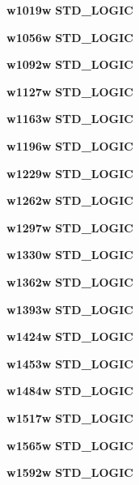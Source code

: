 \begin{DoxyCompactItemize}
\item 
{\bf w1019w} {\bfseries \textcolor{comment}{S\+T\+D\+\_\+\+L\+O\+G\+IC}\textcolor{vhdlchar}{ }} 
\item 
{\bf w1056w} {\bfseries \textcolor{comment}{S\+T\+D\+\_\+\+L\+O\+G\+IC}\textcolor{vhdlchar}{ }} 
\item 
{\bf w1092w} {\bfseries \textcolor{comment}{S\+T\+D\+\_\+\+L\+O\+G\+IC}\textcolor{vhdlchar}{ }} 
\item 
{\bf w1127w} {\bfseries \textcolor{comment}{S\+T\+D\+\_\+\+L\+O\+G\+IC}\textcolor{vhdlchar}{ }} 
\item 
{\bf w1163w} {\bfseries \textcolor{comment}{S\+T\+D\+\_\+\+L\+O\+G\+IC}\textcolor{vhdlchar}{ }} 
\item 
{\bf w1196w} {\bfseries \textcolor{comment}{S\+T\+D\+\_\+\+L\+O\+G\+IC}\textcolor{vhdlchar}{ }} 
\item 
{\bf w1229w} {\bfseries \textcolor{comment}{S\+T\+D\+\_\+\+L\+O\+G\+IC}\textcolor{vhdlchar}{ }} 
\item 
{\bf w1262w} {\bfseries \textcolor{comment}{S\+T\+D\+\_\+\+L\+O\+G\+IC}\textcolor{vhdlchar}{ }} 
\item 
{\bf w1297w} {\bfseries \textcolor{comment}{S\+T\+D\+\_\+\+L\+O\+G\+IC}\textcolor{vhdlchar}{ }} 
\item 
{\bf w1330w} {\bfseries \textcolor{comment}{S\+T\+D\+\_\+\+L\+O\+G\+IC}\textcolor{vhdlchar}{ }} 
\item 
{\bf w1362w} {\bfseries \textcolor{comment}{S\+T\+D\+\_\+\+L\+O\+G\+IC}\textcolor{vhdlchar}{ }} 
\item 
{\bf w1393w} {\bfseries \textcolor{comment}{S\+T\+D\+\_\+\+L\+O\+G\+IC}\textcolor{vhdlchar}{ }} 
\item 
{\bf w1424w} {\bfseries \textcolor{comment}{S\+T\+D\+\_\+\+L\+O\+G\+IC}\textcolor{vhdlchar}{ }} 
\item 
{\bf w1453w} {\bfseries \textcolor{comment}{S\+T\+D\+\_\+\+L\+O\+G\+IC}\textcolor{vhdlchar}{ }} 
\item 
{\bf w1484w} {\bfseries \textcolor{comment}{S\+T\+D\+\_\+\+L\+O\+G\+IC}\textcolor{vhdlchar}{ }} 
\item 
{\bf w1517w} {\bfseries \textcolor{comment}{S\+T\+D\+\_\+\+L\+O\+G\+IC}\textcolor{vhdlchar}{ }} 
\item 
{\bf w1565w} {\bfseries \textcolor{comment}{S\+T\+D\+\_\+\+L\+O\+G\+IC}\textcolor{vhdlchar}{ }} 
\item 
{\bf w1592w} {\bfseries \textcolor{comment}{S\+T\+D\+\_\+\+L\+O\+G\+IC}\textcolor{vhdlchar}{ }} 
\item 

\end{DoxyCompactItemize}
